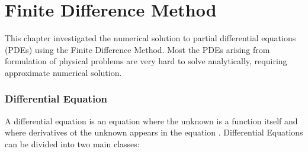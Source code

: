 
\chapter{Finite Difference Method}
\label{ch:FDM}
This chapter investigated the numerical solution to partial differential equations (PDEs) using the Finite Difference Method. Most the PDEs arising from formulation of physical problems are very hard to solve analytically, requiring approximate numerical solution. 


\subsection{Differential Equation}
A differential equation is an equation where the unknown is a function itself and where derivatives ot the unknown appears in the equation \cite{Larsoon:2004} \cite{Mcowen:2002}. Differential Equations can be divided into two main classes:

